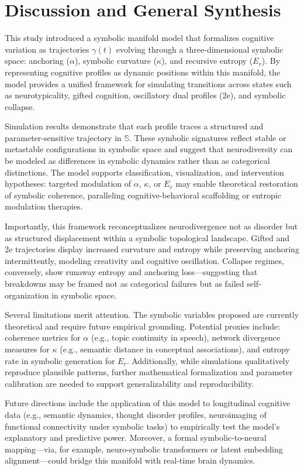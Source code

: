 \section*{Discussion and General Synthesis}

This study introduced a symbolic manifold model that formalizes cognitive variation as trajectories $\gamma(t)$ evolving through a three-dimensional symbolic space: anchoring ($\alpha$), symbolic curvature ($\kappa$), and recursive entropy ($E_r$). By representing cognitive profiles as dynamic positions within this manifold, the model provides a unified framework for simulating transitions across states such as neurotypicality, gifted cognition, oscillatory dual profiles (2e), and symbolic collapse.

Simulation results demonstrate that each profile traces a structured and parameter-sensitive trajectory in $\mathbb{S}$. These symbolic signatures reflect stable or metastable configurations in symbolic space and suggest that neurodiversity can be modeled as differences in symbolic dynamics rather than as categorical distinctions. The model supports classification, visualization, and intervention hypotheses: targeted modulation of $\alpha$, $\kappa$, or $E_r$ may enable theoretical restoration of symbolic coherence, paralleling cognitive-behavioral scaffolding or entropic modulation therapies.

Importantly, this framework reconceptualizes neurodivergence not as disorder but as structured displacement within a symbolic topological landscape. Gifted and 2e trajectories display increased curvature and entropy while preserving anchoring intermittently, modeling creativity and cognitive oscillation. Collapse regimes, conversely, show runaway entropy and anchoring loss—suggesting that breakdowns may be framed not as categorical failures but as failed self-organization in symbolic space.

Several limitations merit attention. The symbolic variables proposed are currently theoretical and require future empirical grounding. Potential proxies include: coherence metrics for $\alpha$ (e.g., topic continuity in speech), network divergence measures for $\kappa$ (e.g., semantic distance in conceptual associations), and entropy rate in symbolic generation for $E_r$. Additionally, while simulations qualitatively reproduce plausible patterns, further mathematical formalization and parameter calibration are needed to support generalizability and reproducibility.

Future directions include the application of this model to longitudinal cognitive data (e.g., semantic dynamics, thought disorder profiles, neuroimaging of functional connectivity under symbolic tasks) to empirically test the model's explanatory and predictive power. Moreover, a formal symbolic-to-neural mapping—via, for example, neuro-symbolic transformers or latent embedding alignment—could bridge this manifold with real-time brain dynamics.

